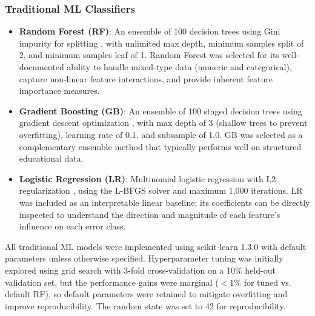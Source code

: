 \documentclass[10pt,letterpaper]{article}
\begin{document}
\subsubsection*{Traditional ML Classifiers}
\begin{itemize}
    \item \textbf{Random Forest (RF)}: An ensemble of 100 decision trees using
          Gini impurity for splitting \cite{breiman2001random}, with unlimited max depth, minimum
          samples split of 2, and minimum samples leaf of 1. Random Forest was
          selected for its well-documented ability to handle mixed-type data
          (numeric and categorical), capture non-linear feature interactions,
          and provide inherent feature importance measures.
    \item \textbf{Gradient Boosting (GB)}: An ensemble of 100 staged
          decision trees using gradient descent optimization \cite{friedman2001greedy}, with max depth
          of 3 (shallow trees to prevent overfitting), learning rate of 0.1,
          and subsample of 1.0. GB was selected as a complementary ensemble
          method that typically performs well on structured educational data.
    \item \textbf{Logistic Regression (LR)}: Multinomial logistic regression
          with L2 regularization \cite{hosmer2013logistic}, using the L-BFGS solver and maximum 1,000
          iterations. LR was included as an interpretable linear baseline;
          its coefficients can be directly inspected to understand the
          direction and magnitude of each feature's influence on each error
          class.
\end{itemize}

All traditional ML models were implemented using scikit-learn 1.3.0 \cite{pedregosa2011scikit} with
default parameters unless otherwise specified. Hyperparameter tuning was
initially explored using grid search with 3-fold cross-validation on a 10\%
held-out validation set, but the performance gains were marginal ($< 1\%$ for
tuned vs. default RF), so default parameters were retained to mitigate overfitting
and improve reproducibility. The random state was set to 42 for reproducibility.
\end{document}
